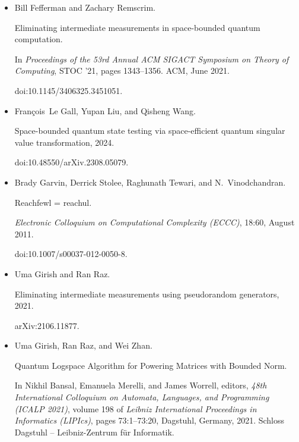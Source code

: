 \documentclass[10pt,a4paper]{article}
\begin{document}
\begin{itemize}
doi:10.4230/LIPIcs.ITCS.2018.4.





\item[] 
[10]

Bill Fefferman and Zachary Remscrim.


Eliminating intermediate measurements in space-bounded quantum
computation.


In \emph{Proceedings of the 53rd Annual ACM SIGACT Symposium on Theory
of Computing}, STOC ’21, pages 1343–1356. ACM, June 2021.


doi:10.1145/3406325.3451051.





\item[] 
[11]

François Le Gall, Yupan Liu, and Qisheng Wang.


Space-bounded quantum state testing via space-efficient quantum
singular value transformation, 2024.


doi:10.48550/arXiv.2308.05079.





\item[] 
[12]

Brady Garvin, Derrick Stolee, Raghunath Tewari, and N. Vinodchandran.


Reachfewl = reachul.


\emph{Electronic Colloquium on Computational Complexity (ECCC)},
18:60, August 2011.


doi:10.1007/s00037-012-0050-8.





\item[] 
[13]

Uma Girish and Ran Raz.


Eliminating intermediate measurements using pseudorandom generators,
2021.


arXiv:2106.11877.





\item[] 
[14]

Uma Girish, Ran Raz, and Wei Zhan.


Quantum Logspace Algorithm for Powering Matrices with Bounded Norm.


In Nikhil Bansal, Emanuela Merelli, and James Worrell, editors, \emph{48th International Colloquium on Automata, Languages, and Programming (ICALP
2021)}, volume 198 of \emph{Leibniz International Proceedings in Informatics
(LIPIcs)}, pages 73:1–73:20, Dagstuhl, Germany, 2021. Schloss Dagstuhl –
Leibniz-Zentrum für Informatik.



\end{itemize}
\end{document}
